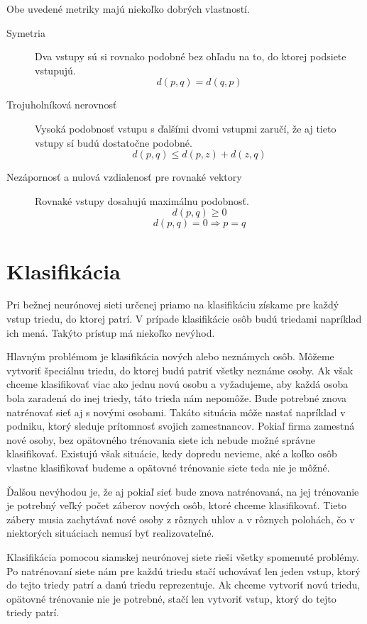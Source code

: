 Obe uvedené metriky majú niekoľko dobrých vlastností.
\begin{description}
\item[Symetria] Dva vstupy sú si rovnako podobné bez ohľadu na to, do ktorej podsiete vstupujú. 
$$d(p, q) = d(q, p) $$
\item[Trojuholníková nerovnosť] Vysoká podobnosť vstupu s ďalšími dvomi vstupmi zaručí, že aj tieto vstupy sí budú dostatočne podobné.
$$d(p, q) 	\leq d(p, z) + d(z, q)$$
\item[Nezápornosť a nulová vzdialenosť pre rovnaké vektory] Rovnaké vstupy dosahujú maximálnu podobnosť.
$$d(p, q) \geq 0$$
$$d(p, q) = 0 \Rightarrow p = q$$
\end{description}

\section{Klasifikácia}
Pri bežnej neurónovej sieti určenej priamo na klasifikáciu získame pre každý vstup triedu, do ktorej patrí.
V prípade klasifikácie osôb budú triedami napríklad ich mená.
Takýto prístup má niekoľko nevýhod.

Hlavným problémom je klasifikácia nových alebo neznámych osôb. 
Môžeme vytvoriť špeciálnu triedu, do ktorej budú patriť všetky neznáme osoby.
Ak však chceme klasifikovať viac ako jednu novú osobu a vyžadujeme, aby každá osoba bola zaradená do inej triedy, táto trieda nám nepomôže.
Bude potrebné znova natrénovať sieť aj s novými osobami.
Takáto situácia môže nastať napríklad v podniku, ktorý sleduje prítomnosť svojich zamestnancov.
Pokiaľ firma zamestná nové osoby, bez opätovného trénovania siete ich nebude možné správne klasifikovať.
Existujú však situácie, kedy dopredu nevieme, aké a koľko osôb vlastne klasifikovať budeme a opätovné trénovanie siete teda nie je môžné.

Ďalšou nevýhodou je, že aj pokiaľ sieť bude znova natrénovaná, na jej trénovanie je potrebný veľký počet záberov nových osôb, ktoré chceme klasifikovať.
Tieto zábery musia zachytávať nové osoby z rôznych uhlov a v rôznych polohách, čo v niektorých situáciach nemusí byť realizovateľné.

Klasifikácia pomocou siamskej neurónovej siete rieši všetky spomenuté problémy.
Po natrénovaní siete nám pre každú triedu stačí uchovávať len jeden vstup, ktorý do tejto triedy patrí a danú triedu reprezentuje.
Ak chceme vytvoriť novú triedu, opätovné trénovanie nie je potrebné, stačí len vytvoriť vstup, ktorý do tejto triedy patrí.

